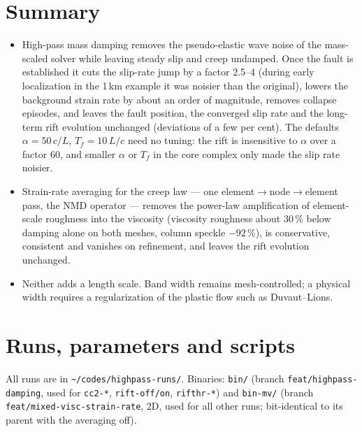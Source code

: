 \documentclass[11pt]{article}
\newcommand{\code}[1]{\texttt{#1}}
\begin{document}
\section{Summary}
\begin{itemize}
\item High-pass mass damping removes the pseudo-elastic wave noise of the mass-scaled solver while
  leaving steady slip and creep undamped. Once the fault is established it cuts the slip-rate jump by a factor 2.5--4 (during early
  localization in the 1\,km example it was noisier than the original), lowers the
  background strain rate by about an order of magnitude, removes collapse episodes, and leaves the
  fault position, the converged slip rate and the long-term rift evolution unchanged
  (deviations of a few per cent). The defaults $\alpha=50\,c/L$, $T_f=10\,L/c$ need no tuning:
  the rift is insensitive to $\alpha$ over a factor 60, and smaller $\alpha$ or $T_f$ in the core
  complex only made the slip rate noisier.
\item Strain-rate averaging for the creep law --- one element$\to$node$\to$element pass, the NMD
  operator --- removes the power-law amplification of element-scale roughness into the viscosity
  (viscosity roughness about 30\,\% below damping alone on both meshes, column speckle $-92\,\%$), is
  conservative, consistent and vanishes on refinement, and leaves the rift evolution unchanged.
\item Neither adds a length scale. Band width remains mesh-controlled; a physical width requires a
  regularization of the plastic flow such as Duvaut--Lions.
\end{itemize}

\appendix
\section{Runs, parameters and scripts}
\label{app:scripts}

All runs are in \code{\textasciitilde/codes/highpass-runs/}. Binaries: \code{bin/} (branch
\code{feat/highpass-damping}, used for \code{cc2-*}, \code{rift-off/on}, \code{rifthr-*}) and
\code{bin-mv/} (branch \code{feat/mixed-visc-strain-rate}, 2D, used for all other runs; bit-identical
to its parent with the averaging off).
\end{document}
